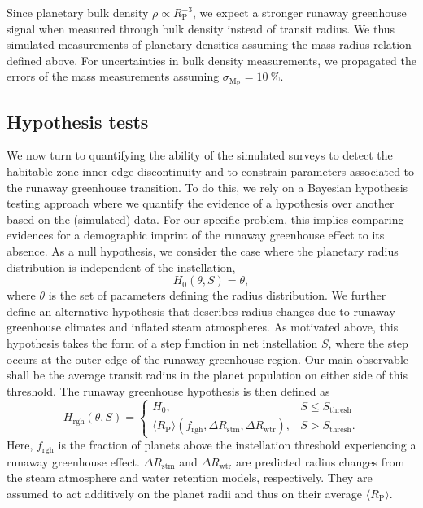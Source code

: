 \documentclass[twocolumn,twocolappendix,linenumbers]{aastex631}
\begin{document}
Since planetary bulk density $\rho \propto R_\mathrm{P}^{-3}$, we expect a stronger runaway greenhouse signal when measured through bulk density instead of transit radius.
We thus simulated measurements of planetary densities assuming the mass-radius relation defined above.
For uncertainties in bulk density measurements, we propagated the errors of the mass measurements assuming $\sigma_\mathrm{M_\mathrm{P}} = \SI{10}{\percent}$.


\subsection{Hypothesis tests}
We now turn to quantifying the ability of the simulated surveys to detect the habitable zone inner edge discontinuity and to constrain parameters associated to the runaway greenhouse transition.
To do this, we rely on a Bayesian hypothesis testing approach where we quantify the evidence of a hypothesis over another based on the (simulated) data.
For our specific problem, this implies comparing evidences for a demographic imprint of the runaway greenhouse effect to its absence.
    As a null hypothesis, we consider the case where the planetary radius distribution is independent of the instellation,
    \begin{equation}
        H_0(\theta, S) = \theta,
    \end{equation}
    where $\theta$ is the set of parameters defining the radius distribution.
    We further define an alternative hypothesis that describes radius changes due to runaway greenhouse climates and inflated steam atmospheres.
    As motivated above, this hypothesis takes the form of a step function in net instellation $S$, where the step occurs at the outer edge of the runaway greenhouse region.
    Our main observable shall be the average transit radius in the planet population on either side of this threshold.
    The runaway greenhouse hypothesis is then defined as
\begin{equation}\label{eq:rgh_hypo}
    H_{\mathrm{rgh}}(\theta, S) =
        \begin{cases}
            H_0, &  S \leq S_\mathrm{thresh}\\
            \langle R_\mathrm{P}\rangle (f_\mathrm{rgh},\Delta R_\mathrm{stm}, \Delta R_\mathrm{wtr}), &  S > S_\mathrm{thresh}.
        \end{cases}
\end{equation}
    Here, $f_\mathrm{rgh}$ is the fraction of planets above the instellation threshold experiencing a runaway greenhouse effect.
    $\Delta R_\mathrm{stm}$ and $\Delta R_\mathrm{wtr}$ are predicted radius changes from the steam atmosphere and water retention models, respectively.
    They are assumed to act additively on the planet radii and thus on their average $\langle R_\mathrm{P}\rangle $.
\end{document}

